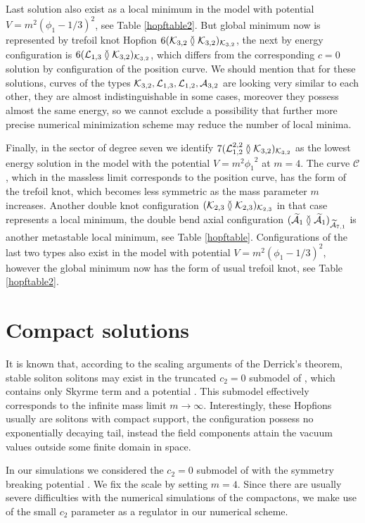 \documentclass[12pt,a4paper]{article}
\begin{document}
Last solution also exist as a local minimum in the model with potential $V=m^2(\phi_1-1/3)^2$, see
Table \ref{hopftable2}. But global minimum now is represented by trefoil knot Hopfion
$6(\mathcal{K}_{3,2}\between\mathcal{K}_{3,2})_{\mathcal{K}_{3,2}}$, the next by energy configuration is
$6(\mathcal{L}_{1,3}\between\mathcal{K}_{3,2})_{\mathcal{K}_{3,2}}$, which differs from the corresponding $c=0$ solution
by configuration of the position curve. We should mention that for these solutions, curves of the types
$\mathcal{K}_{3,2}, \mathcal{L}_{1,3}, \mathcal{L}_{1,2}, \mathcal{A}_{3,2}$  are looking very similar to each other, they are
almost indistinguishable in some cases, moreover they possess almost the same energy, so we cannot exclude a possibility that further
more precise numerical minimization scheme may reduce the number of local minima.


Finally, in the sector of degree seven we identify  $7(\mathcal{L}_{1,2}^{2,2}\between\mathcal{K}_{3,2})_{\mathcal{K}_{3,2}}$
as the lowest energy solution in the model with the potential $V=m^2{\phi_1}^2$ at $m=4$.
The curve $\mathcal{C}$, which in the massless limit corresponds to the position curve, has the form of the
trefoil knot, which becomes less symmetric as the mass parameter $m$ increases.
Another double knot
configuration $(\mathcal{K}_{2,3}\between\mathcal{K}_{2,3})_{\mathcal{K}_{2,3}}$ in that case represents a local minimum, the double bend
axial configuration $(\widetilde{\mathcal{A}}_1\between\widetilde{\mathcal{A}}_1)_{\widetilde{\mathcal{A}}_{7,1}}$ is another metastable
local minimum, see Table \ref{hopftable}. Configurations of the last two types also exist in the model
with potential $V=m^2(\phi_1-1/3)^2$, however the global minimum now has the form of usual trefoil knot, see
Table \ref{hopftable2}.




\section{Compact solutions}
It is known that, according to the scaling arguments of the Derrick's theorem, stable
soliton solitons may exist in the truncated $c_2=0$ submodel of , which contains only Skyrme term and a potential
\cite{Foster:2010zb,Adam-compact}. This submodel effectively corresponds to the infinite mass limit $m\to \infty$. Interestingly,
these Hopfions usually are solitons with compact support, the configuration
possess no exponentially decaying tail, instead the
field components attain the vacuum values outside some finite domain in space.

In our simulations we considered the $c_2=0$ submodel of  with the symmetry breaking potential .
We fix the scale by setting $m=4$. Since there are usually severe difficulties with the numerical simulations of the compactons,
we make use of the small $c_2$ parameter as a regulator in our numerical scheme.
\end{document}

